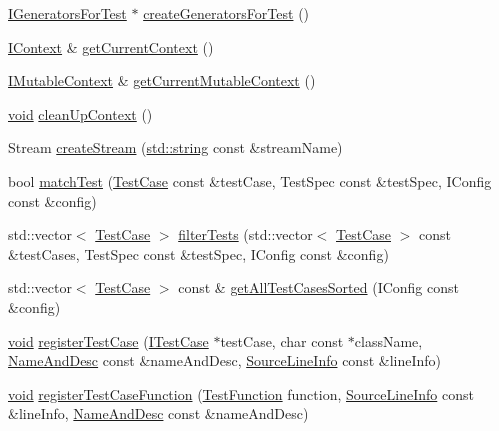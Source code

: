 \begin{DoxyCompactItemize}
\item 
\hyperlink{struct_catch_1_1_i_generators_for_test}{I\+Generators\+For\+Test} $\ast$ \hyperlink{namespace_catch_a3d93b31e88fd01ee9e0d20757ff64eab}{create\+Generators\+For\+Test} ()
\item 
\hyperlink{struct_catch_1_1_i_context}{I\+Context} \& \hyperlink{namespace_catch_ad517cca9b21deb79101e90e5508dd161}{get\+Current\+Context} ()
\item 
\hyperlink{struct_catch_1_1_i_mutable_context}{I\+Mutable\+Context} \& \hyperlink{namespace_catch_af7bb0c32ab2453d2f53e92a96d15360e}{get\+Current\+Mutable\+Context} ()
\item 
\hyperlink{_s_d_l__opengles2__gl2ext_8h_ae5d8fa23ad07c48bb609509eae494c95}{void} \hyperlink{namespace_catch_ae50508f10ffc4ed873a31a4db4caea16}{clean\+Up\+Context} ()
\item 
Stream \hyperlink{namespace_catch_ad7591011c5d99d59504ecd3384001c3e}{create\+Stream} (\hyperlink{_s_d_l__opengl__glext_8h_ae84541b4f3d8e1ea24ec0f466a8c568b}{std\+::string} const \&stream\+Name)
\item 
bool \hyperlink{namespace_catch_aadef80fbc6bc84589777a462770cef49}{match\+Test} (\hyperlink{class_catch_1_1_test_case}{Test\+Case} const \&test\+Case, Test\+Spec const \&test\+Spec, I\+Config const \&config)
\item 
std\+::vector$<$ \hyperlink{class_catch_1_1_test_case}{Test\+Case} $>$ \hyperlink{namespace_catch_ab5da9aa67c42a3f626aea07d0b556829}{filter\+Tests} (std\+::vector$<$ \hyperlink{class_catch_1_1_test_case}{Test\+Case} $>$ const \&test\+Cases, Test\+Spec const \&test\+Spec, I\+Config const \&config)
\item 
std\+::vector$<$ \hyperlink{class_catch_1_1_test_case}{Test\+Case} $>$ const \& \hyperlink{namespace_catch_a1c9b1a23bc947ea70ddaabf067276cf2}{get\+All\+Test\+Cases\+Sorted} (I\+Config const \&config)
\item 
\hyperlink{_s_d_l__opengles2__gl2ext_8h_ae5d8fa23ad07c48bb609509eae494c95}{void} \hyperlink{namespace_catch_a9a59d681cc327a33c280796561dfe258}{register\+Test\+Case} (\hyperlink{struct_catch_1_1_i_test_case}{I\+Test\+Case} $\ast$test\+Case, char const $\ast$class\+Name, \hyperlink{struct_catch_1_1_name_and_desc}{Name\+And\+Desc} const \&name\+And\+Desc, \hyperlink{struct_catch_1_1_source_line_info}{Source\+Line\+Info} const \&line\+Info)
\item 
\hyperlink{_s_d_l__opengles2__gl2ext_8h_ae5d8fa23ad07c48bb609509eae494c95}{void} \hyperlink{namespace_catch_a220159aeff47f9c5231e893f2abbc643}{register\+Test\+Case\+Function} (\hyperlink{namespace_catch_a26414f52d0835939fae52aadd27e6257}{Test\+Function} function, \hyperlink{struct_catch_1_1_source_line_info}{Source\+Line\+Info} const \&line\+Info, \hyperlink{struct_catch_1_1_name_and_desc}{Name\+And\+Desc} const \&name\+And\+Desc)

\end{DoxyCompactItemize}
